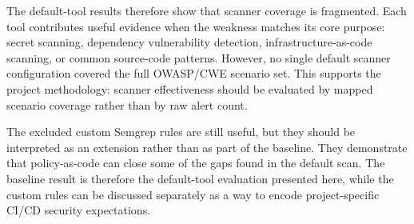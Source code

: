 The default-tool results therefore show that scanner coverage is fragmented. Each tool contributes useful evidence when the weakness matches its core purpose: secret scanning, dependency vulnerability detection, infrastructure-as-code scanning, or common source-code patterns. However, no single default scanner configuration covered the full OWASP/CWE scenario set. This supports the project methodology: scanner effectiveness should be evaluated by mapped scenario coverage rather than by raw alert count.

The excluded custom Semgrep rules are still useful, but they should be interpreted as an extension rather than as part of the baseline. They demonstrate that policy-as-code can close some of the gaps found in the default scan. The baseline result is therefore the default-tool evaluation presented here, while the custom rules can be discussed separately as a way to encode project-specific CI/CD security expectations.

